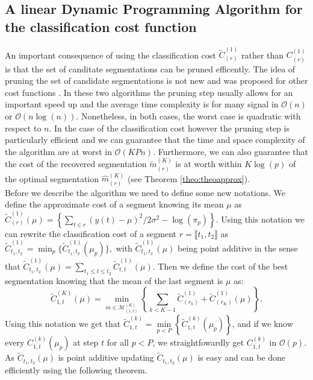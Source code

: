 \documentclass[11pt]{llncs}
\begin{document}
\subsection{A linear Dynamic Programming Algorithm for the classification cost function}

An important consequence of using the classification cost $\widetilde{C}_{(r)}^{(1)}$ rather than ${C}_{(r)}^{(1)}$ is that the set of canditate segmentations 
can be pruned efficently. The idea of pruning the set of candidate segmentations
is not new and was proposed for other cost functions  \cite{rigaill_2010,killick_optimal_2011}.
In these two algorithms the pruning step usually allows for an important speed up and the average time complexity is for many signal in $\mathcal{O}(n)$ or  $\mathcal{O}(n\log(n))$. Nonetheless, in both cases, the worst case is quadratic with respect to $n$.
In the case of the classification cost however the pruning step is particularly 
efficient %
and we can guarantee that the time and space complexity of the algorithm are at worst in $\mathcal{O}(KPn)$. 
Furthermore, we can also guarantee that the cost of the recovered segmentation $\widetilde{m}_{(r)}^{(K)}$ is at worth within $K \log(p)$ of the optimal segmentation $\widehat{m}_{(r)}^{(K)}$ (see Theorem \ref{theo:theoapprox}). \\
\indent Before we describe the algorithm we need to define some new notations. We define the approximate cost of a segment knowing its mean $\mu$ as 
$ \widetilde{C}_{(r)}^{(1)}   (\mu) = \left\{ \sum_{t \in r} (y(t)- \mu)^2  /2 \sigma^2  - \log(\pi_p) \right\}.$ Using this notation we can rewrite the classification cost of a segment $r = \llbracket t_1, t_2 \rrbracket$ as $\widetilde{C}_{t_1, t_2}^{(1)}  = \min_p \{  \widetilde{C}_{t_1, t_2}^{(1)}  (\mu_p) \},$ with $\widetilde{C}_{t_1, t_2}^{(1)}  (\mu)$ being point additive in the sense that $\widetilde{C}_{t_1, t_2}^{(1)}  (\mu) = \underset{ t_1 \leq t \leq t_2}{\sum} \widetilde{C}_{t, t}^{(1)}  (\mu).$ Then we define the cost of the best segmentation knowing that the mean of the last segment is $\mu$ as:
$$\widetilde{C}_{1, t}^{(K)}(\mu) = \underset{{m \in \mathcal{M}^{(K)}_{(1, t)}}}{\min} \left\{ \sum_{k < K-1}  \widetilde{C}^{(1)}_{(r_k)}  + \widetilde{C}^{(1)}_{(r_K)}(\mu) \right\}.$$
Using this notation we get that $ \widetilde{C}_{1, t}^{(k)}  = \underset{p < P}{\min} \left\{ \widetilde{C}_{1, t}^{(k)}(\mu_p) \right\}$, and if we know every $C_{1, t}^{(k)}(\mu_p)$ at step $t$ for all $p< P$, we straightfowardly get $C_{1, t}^{(k)}$ in $\mathcal{O}(p)$. As $\widetilde{C}_{t_1, t_2} (\mu)$ is point additive 
updating $\widetilde{C}_{t_1, t_2} (\mu)$ is easy and can be done efficiently using the following theorem.
\end{document}
